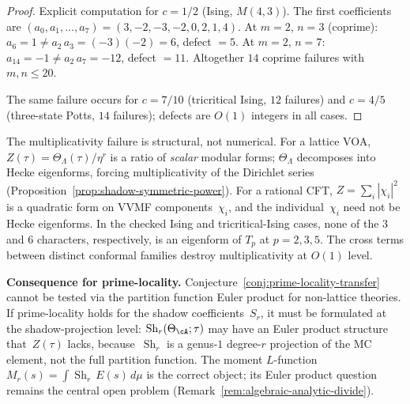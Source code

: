 \begin{proof}
Explicit computation for $c = 1/2$ \textup{(Ising, $M(4,3)$)}.
The first coefficients are
$(a_0, a_1, \ldots, a_7) = (3, -2, -3, -2, 0, 2, 1, 4)$.
At $m = 2$, $n = 3$ (coprime):
$a_6 = 1 \neq a_2\,a_3 = (-3)(-2) = 6$,
defect $= 5$. At $m = 2$, $n = 7$:
$a_{14} = -1 \neq a_2\,a_7 = -12$, defect $= 11$.
Altogether $14$ coprime failures with $m, n \le 20$.

The same failure occurs for $c = 7/10$ (tricritical Ising,
$12$ failures) and $c = 4/5$ (three-state Potts, $14$
failures); defects are $O(1)$ integers in all cases.
\end{proof}

\begin{remark}%
\label{rem:naive-prime-locality-obstruction}%
%
The multiplicativity failure is structural, not numerical.
For a lattice VOA, $Z(\tau) = \Theta_\Lambda(\tau)/\eta^r$
is a ratio of \emph{scalar} modular forms; $\Theta_\Lambda$
decomposes into Hecke eigenforms, forcing multiplicativity of
the Dirichlet series
(Proposition~\ref{prop:shadow-symmetric-power}).
For a rational CFT, $Z = \sum_i |\chi_i|^2$ is a quadratic
form on VVMF components~$\chi_i$, and the individual~$\chi_i$
need not be Hecke eigenforms. In the checked Ising and
tricritical-Ising cases, none of the $3$ and $6$ characters,
respectively, is an eigenform of $T_p$ at $p = 2,3,5$.
The cross terms between distinct conformal families destroy
multiplicativity at $O(1)$ level.

\textbf{Consequence for prime-locality.}
Conjecture~\ref{conj:prime-locality-transfer} cannot be tested via
the partition function Euler product for non-lattice theories.
If prime-locality holds for the shadow coefficients~$S_r$,
it must be formulated at the shadow-projection level:
$\operatorname{Sh}_r(\Theta_\cA; \tau)$ may have an Euler product
structure that~$Z(\tau)$ lacks, because~$\operatorname{Sh}_r$
is a genus-$1$ degree-$r$ projection of the MC element, not the
full partition function.
The moment $L$-function
$M_r(s) = \int \operatorname{Sh}_r\,E(s)\,d\mu$ is the correct
object; its Euler product question remains the central open problem
(Remark~\ref{rem:algebraic-analytic-divide}).
\end{remark}

